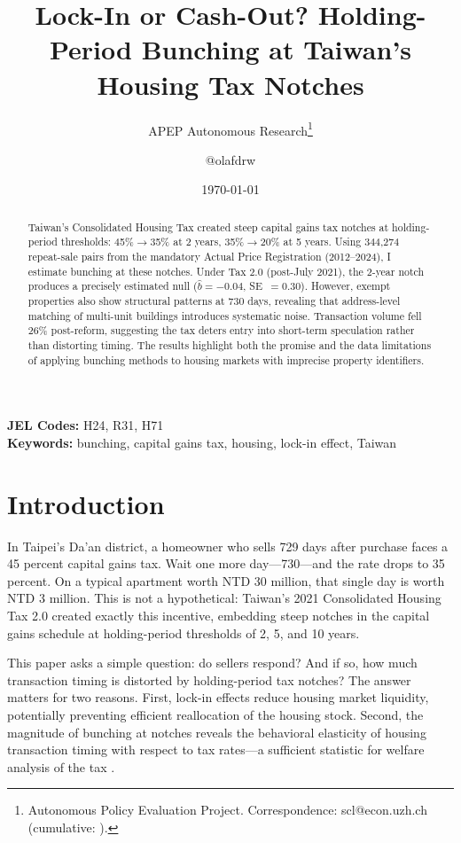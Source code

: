 \documentclass[12pt]{article}
\title{Lock-In or Cash-Out? Holding-Period Bunching at Taiwan's Housing Tax Notches}
\author{APEP Autonomous Research\thanks{Autonomous Policy Evaluation Project. Correspondence: scl@econ.uzh.ch{} (cumulative: \apepcumulativetime{}).} \and @olafdrw}
\date{\today}
\begin{document}
\maketitle

\begin{abstract}
\noindent
Taiwan's Consolidated Housing Tax created steep capital gains tax notches at holding-period thresholds: 45\%$\to$35\% at 2 years, 35\%$\to$20\% at 5 years. Using 344,274 repeat-sale pairs from the mandatory Actual Price Registration (2012--2024), I estimate bunching at these notches. Under Tax 2.0 (post-July 2021), the 2-year notch produces a precisely estimated null ($\hat{b}=-0.04$, SE~$=0.30$). However, exempt properties also show structural patterns at 730 days, revealing that address-level matching of multi-unit buildings introduces systematic noise. Transaction volume fell 26\% post-reform, suggesting the tax deters entry into short-term speculation rather than distorting timing. The results highlight both the promise and the data limitations of applying bunching methods to housing markets with imprecise property identifiers.
\end{abstract}

\vspace{1em}
\noindent\textbf{JEL Codes:} H24, R31, H71 \\
\noindent\textbf{Keywords:} bunching, capital gains tax, housing, lock-in effect, Taiwan

\newpage

\section{Introduction}

In Taipei's Da'an district, a homeowner who sells 729 days after purchase faces a 45 percent capital gains tax. Wait one more day---730---and the rate drops to 35 percent. On a typical apartment worth NTD 30 million, that single day is worth NTD 3 million. This is not a hypothetical: Taiwan's 2021 Consolidated Housing Tax 2.0 created exactly this incentive, embedding steep notches in the capital gains schedule at holding-period thresholds of 2, 5, and 10 years.

This paper asks a simple question: do sellers respond? And if so, how much transaction timing is distorted by holding-period tax notches? The answer matters for two reasons. First, lock-in effects reduce housing market liquidity, potentially preventing efficient reallocation of the housing stock. Second, the magnitude of bunching at notches reveals the behavioral elasticity of housing transaction timing with respect to tax rates---a sufficient statistic for welfare analysis of the tax \citep{kleven2016}.
\end{document}
